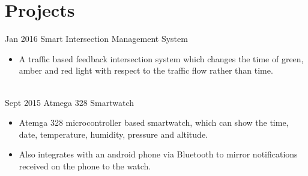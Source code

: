 \documentclass[letterpaper]{twentysecondcv} %
\begin{document}
\vspace{-5mm}
\section{Projects}

\begin{twenty} %
	\twentyitem
    	{Jan 2016}
        {Smart Intersection Management System}
        {\href{}{}}
        {}
        {
        {\begin{itemize}
        \item A traffic based feedback intersection system which changes the time of green, amber and red light with respect to the traffic flow rather than time.      
         \end{itemize}}
        }
        
        \\
        
    \twentyitem
   		{Sept 2015}
        {Atmega 328 Smartwatch}
        {\href{}{}}
        {}
        {
        {\begin{itemize}
        \item Atemga 328 microcontroller based smartwatch, which can show the time, date, temperature, humidity, pressure and altitude.
\item Also integrates with an android phone via Bluetooth to mirror notifications received on the phone to the watch.

    \end{itemize}}
        }
           
\end{twenty}
\vspace{3mm}
\end{document}

